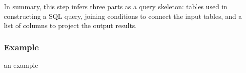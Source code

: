 In summary, this step infers three parts as a query skeleton: tables used in constructing a SQL query, joining conditions
to connect the input tables, and a list of columns to project the output results.





\subsubsection{Example}

an example

